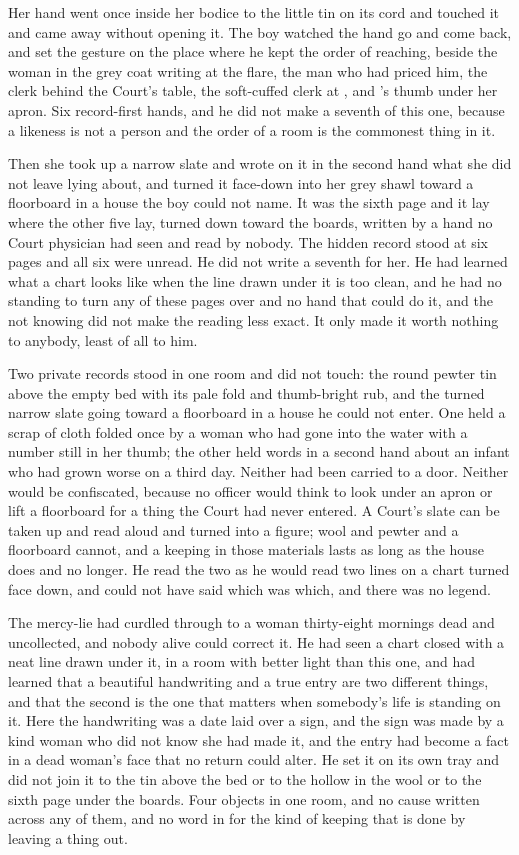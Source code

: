Her hand went once inside her bodice to the little tin on its cord and touched it and came away without opening it. The boy watched the hand go and come back, and set the gesture on the place where he kept the order of reaching, beside the woman in the grey coat writing at the flare, the man who had priced him, the clerk behind the Court's table, the soft-cuffed clerk at , and 's thumb under her apron. Six record-first hands, and he did not make a seventh of this one, because a likeness is not a person and the order of a room is the commonest thing in it.

Then she took up a narrow slate and wrote on it in the second hand what she did not leave lying about, and turned it face-down into her grey shawl toward a floorboard in a house the boy could not name. It was the sixth page and it lay where the other five lay, turned down toward the boards, written by a hand no Court physician had seen and read by nobody. The hidden record stood at six pages and all six were unread. He did not write a seventh for her. He had learned what a chart looks like when the line drawn under it is too clean, and he had no standing to turn any of these pages over and no hand that could do it, and the not knowing did not make the reading less exact. It only made it worth nothing to anybody, least of all to him.

Two private records stood in one room and did not touch: the round pewter tin above the empty bed with its pale fold and thumb-bright rub, and the turned narrow slate going toward a floorboard in a house he could not enter. One held a scrap of cloth folded once by a woman who had gone into the water with a number still in her thumb; the other held words in a second hand about an infant who had grown worse on a third day. Neither had been carried to a door. Neither would be confiscated, because no officer would think to look under an apron or lift a floorboard for a thing the Court had never entered. A Court's slate can be taken up and read aloud and turned into a figure; wool and pewter and a floorboard cannot, and a keeping in those materials lasts as long as the house does and no longer. He read the two as he would read two lines on a chart turned face down, and could not have said which was which, and there was no legend.

The mercy-lie had curdled through to a woman thirty-eight mornings dead and uncollected, and nobody alive could correct it. He had seen a chart closed with a neat line drawn under it, in a room with better light than this one, and had learned that a beautiful handwriting and a true entry are two different things, and that the second is the one that matters when somebody's life is standing on it. Here the handwriting was a date laid over a sign, and the sign was made by a kind woman who did not know she had made it, and the entry had become a fact in a dead woman's face that no return could alter. He set it on its own tray and did not join it to the tin above the bed or to the hollow in the wool or to the sixth page under the boards. Four objects in one room, and no cause written across any of them, and no word in  for the kind of keeping that is done by leaving a thing out.

